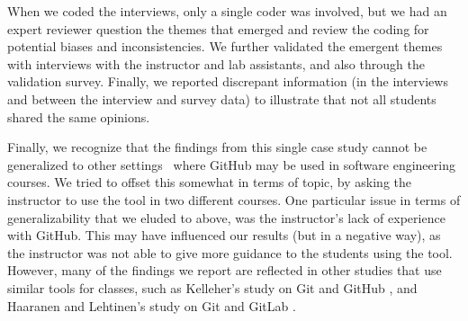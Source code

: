 When we coded the interviews, only a single coder was involved, but we had an expert reviewer question the themes that emerged and review the coding for potential biases and inconsistencies.  We further validated the emergent themes with interviews with the instructor and lab assistants, and also through the validation survey.  Finally, we reported discrepant information (in the interviews and between the interview and survey data) to illustrate that not all students shared the same opinions. 

Finally, we recognize that the findings from this single case study cannot be generalized to other settings~\cite{runeson2012case} where GitHub may be used in software engineering courses.  We tried to offset this somewhat in terms of topic, by asking the instructor to use the tool in two different courses.  One  particular issue in terms of generalizability that we eluded to above, was the instructor's lack of experience with GitHub.  This may have influenced our results (but in a negative way), as the instructor was not able to give more guidance to the students using the tool.  However, many of the findings we report are reflected in other studies that use similar tools for classes, such as Kelleher's study on Git and GitHub \cite{kelleher2014employing}, and Haaranen and Lehtinen's study on Git and GitLab \cite{haaranen2015teaching}.

